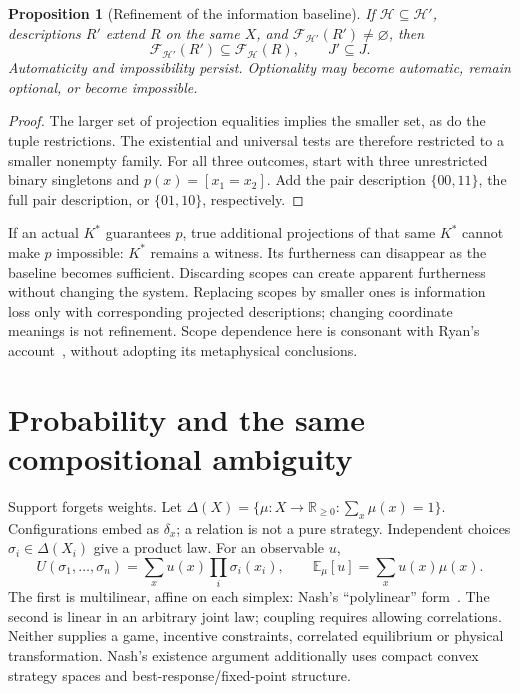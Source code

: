 \documentclass[11pt]{article}
\newtheorem{proposition}[theorem]{Proposition}
\newcommand{\cF}{\mathcal F}
\newcommand{\cH}{\mathcal H}
\newcommand{\E}{\mathbb E}
\begin{document}
\begin{proposition}[Refinement of the information baseline]\label{prop:scope}
If $\cH\subseteq\cH'$, descriptions $R'$ extend $R$ on the same $X$, and $\cF_{\cH'}(R')\ne\varnothing$, then
\begin{equation}\label{eq:refinement}
\cF_{\cH'}(R')\subseteq\cF_{\cH}(R),\qquad J'\subseteq J.
\end{equation}
Automaticity and impossibility persist. Optionality may become automatic, remain optional, or become impossible.
\end{proposition}
\begin{proof}
The larger set of projection equalities implies the smaller set, as do the tuple restrictions. The existential and universal tests are therefore restricted to a smaller nonempty family. For all three outcomes, start with three unrestricted binary singletons and $p(x)=[x_1=x_2]$. Add the pair description $\{00,11\}$, the full pair description, or $\{01,10\}$, respectively.
\end{proof}
If an actual $K^*$ guarantees $p$, true additional projections of that same $K^*$ cannot make $p$ impossible: $K^*$ remains a witness. Its furtherness can disappear as the baseline becomes sufficient. Discarding scopes can create apparent furtherness without changing the system. Replacing scopes by smaller ones is information loss only with corresponding projected descriptions; changing coordinate meanings is not refinement. Scope dependence here is consonant with Ryan's account~\cite{ryan}, without adopting its metaphysical conclusions.

\section{Probability and the same compositional ambiguity}\label{sec:probability}
\label{eq:simplex}Support forgets weights. Let $\Delta(X)=\{\mu:X\to\mathbb R_{\geq0}:\sum_x\mu(x)=1\}$. Configurations embed as $\delta_x$; a relation is not a pure strategy. Independent choices $\sigma_i\in\Delta(X_i)$ give a product law. For an observable $u$,
\begin{equation}\label{eq:mixed}
U(\sigma_1,\ldots,\sigma_n)=\sum_xu(x)\prod_i\sigma_i(x_i),
\qquad \E_\mu[u]=\sum_xu(x)\mu(x).
\end{equation}
The first is multilinear, affine on each simplex: Nash's ``polylinear'' form~\cite{nash}. The second is linear in an arbitrary joint law; coupling requires allowing correlations. Neither supplies a game, incentive constraints, correlated equilibrium or physical transformation. Nash's existence argument additionally uses compact convex strategy spaces and best-response/fixed-point structure.
\end{document}
